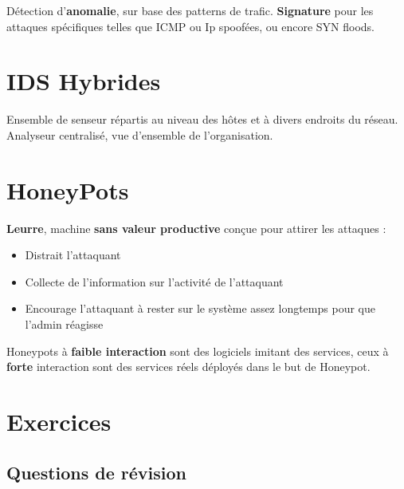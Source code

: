 \documentclass{report}
\begin{document}
		Détection d'\textbf{anomalie}, sur base des patterns de trafic. \textbf{Signature} pour les attaques spécifiques telles que ICMP ou Ip spoofées, ou encore SYN floods.\\

	\section{IDS Hybrides}

		Ensemble de senseur répartis au niveau des hôtes et à divers endroits du réseau.\\
		Analyseur centralisé, vue d'ensemble de l'organisation.\\

	\section{HoneyPots}

		\textbf{Leurre}, machine \textbf{sans valeur productive} conçue pour attirer les attaques : \\
		\begin{itemize}
			\item Distrait l'attaquant
			\item Collecte de l'information sur l'activité de l'attaquant
			\item Encourage l'attaquant à rester sur le système assez longtemps pour que l'admin réagisse\\
		\end{itemize}

		Honeypots à \textbf{faible interaction} sont des logiciels imitant des services, ceux à \textbf{forte} interaction sont des services réels déployés dans le but de Honeypot.\\

	\section{Exercices}

		\subsection{Questions de révision}
\end{document}
